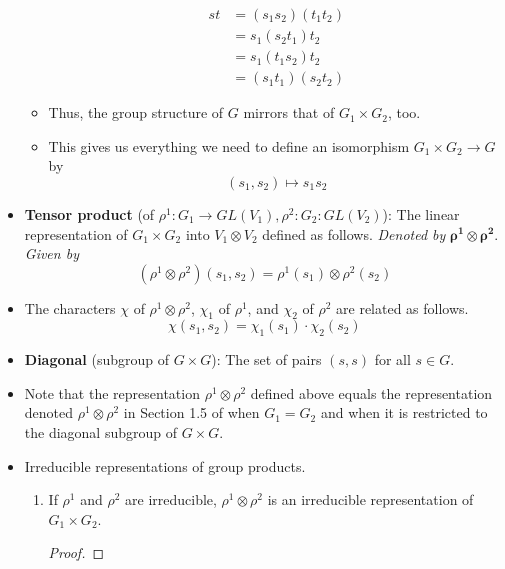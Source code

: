 \documentclass[../notes.tex]{subfiles}
\begin{document}
\begin{itemize}
\begin{itemize}
\begin{align*}
            st &= (s_1s_2)(t_1t_2)\tag*{Condition (i)}\\
            &= s_1(s_2t_1)t_2\\
            &= s_1(t_1s_2)t_2\tag*{Condition (ii)}\\
            &= (s_1t_1)(s_2t_2)
        \end{align*}
        \item Thus, the group structure of $G$ mirrors that of $G_1\times G_2$, too.
        \item This gives us everything we need to define an isomorphism $G_1\times G_2\to G$ by
        \begin{equation*}
            (s_1,s_2) \mapsto s_1s_2
        \end{equation*}
    \end{itemize}
    \item \textbf{Tensor product} (of $\rho^1:G_1\to GL(V_1),\rho^2:G_2:GL(V_2)$): The linear representation of $G_1\times G_2$ into $V_1\otimes V_2$ defined as follows. \emph{Denoted by} $\bm{\rho^1\otimes\rho^2}$. \emph{Given by}
    \begin{equation*}
        (\rho^1\otimes\rho^2)(s_1,s_2) = \rho^1(s_1)\otimes\rho^2(s_2)
    \end{equation*}
    \item The characters $\chi$ of $\rho^1\otimes\rho^2$, $\chi_1$ of $\rho^1$, and $\chi_2$ of $\rho^2$ are related as follows.
    \begin{equation*}
        \chi(s_1,s_2) = \chi_1(s_1)\cdot\chi_2(s_2)
    \end{equation*}
    \item \textbf{Diagonal} (subgroup of $G\times G$): The set of pairs $(s,s)$ for all $s\in G$.
    \item Note that the representation $\rho^1\otimes\rho^2$ defined above equals the representation denoted $\rho^1\otimes\rho^2$ in Section 1.5 of \textcite{bib:Serre} when $G_1=G_2$ and when it is restricted to the diagonal subgroup of $G\times G$.
    \item Irreducible representations of group products.
    \begin{theorem}\label{trm:productIrreps}\leavevmode
        \begin{enumerate}[label={\textup{(\roman*)}}]
            \item If $\rho^1$ and $\rho^2$ are irreducible, $\rho^1\otimes\rho^2$ is an irreducible representation of $G_1\times G_2$.
            \begin{proof}

\end{proof}
\end{enumerate}
\end{theorem}
\end{itemize}
\end{document}
